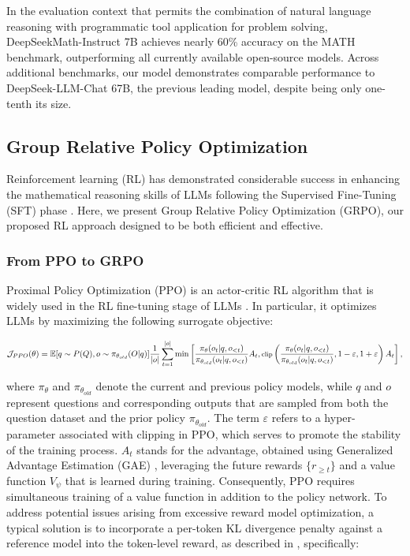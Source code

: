 \begin{itemize}[topsep=0pt]
\begin{itemize}[topsep=0pt]
In the evaluation context that permits the combination of natural language reasoning with programmatic tool application for problem solving, DeepSeekMath-Instruct 7B achieves nearly 60\% accuracy on the MATH benchmark, outperforming all currently available open-source models. Across additional benchmarks, our model demonstrates comparable performance to DeepSeek-LLM-Chat 67B, the previous leading model, despite being only one-tenth its size.

\subsection{Group Relative Policy Optimization} Reinforcement learning (RL) has demonstrated considerable success in enhancing the mathematical reasoning skills of LLMs following the Supervised Fine-Tuning (SFT) phase \citep{wang2023math,wizardmath}. Here, we present Group Relative Policy Optimization (GRPO), our proposed RL approach designed to be both efficient and effective.

\subsubsection{From PPO to GRPO} Proximal Policy Optimization (PPO) \citep{schulman2017proximal} is an actor-critic RL algorithm that is widely used in the RL fine-tuning stage of LLMs \citep{ouyang2022training}. In particular, it optimizes LLMs by maximizing the following surrogate objective:

\begin{equation}
\footnotesize
    \mathcal{J}_{PPO}(\theta) = \mathbb{E}{[q \sim P(Q), o \sim \pi_{\theta_{old}}(O|q)]} \frac{1}{|o|} \sum_{t=1}^{|o|} \min \left[ \frac{\pi_\theta(o_{t} | q, o_{<t})}{\pi_{\theta_{old}}(o_{t} | q, o_{<t})} A_{t}, \text{clip} \left( \frac{\pi_\theta(o_{t} | q, o_{<t})}{\pi_{\theta_{old}}(o_{t} | q, o_{<t})}, 1 - \varepsilon, 1 + \varepsilon \right)  A_{t} \right] ,
\end{equation}

where $\pi_{\theta}$ and $\pi_{\theta_{old}}$ denote the current and previous policy models, while $q$ and $o$ represent questions and corresponding outputs that are sampled from both the question dataset and the prior policy $\pi_{\theta_{old}}$. The term $\varepsilon$ refers to a hyper-parameter associated with clipping in PPO, which serves to promote the stability of the training process. $A_t$ stands for the advantage, obtained using Generalized Advantage Estimation (GAE) \citep{gae}, leveraging the future rewards $\{r_{\ge t}\}$ and a value function $V_{\psi}$ that is learned during training. Consequently, PPO requires simultaneous training of a value function in addition to the policy network. To address potential issues arising from excessive reward model optimization, a typical solution is to incorporate a per-token KL divergence penalty against a reference model into the token-level reward, as described in \citep{ouyang2022training}, specifically:


\end{itemize}
\end{itemize}
